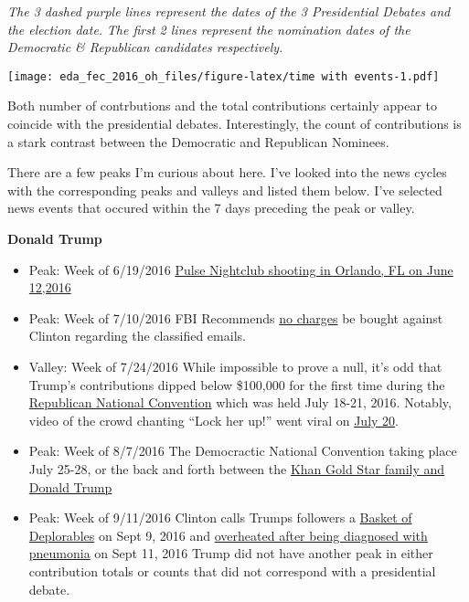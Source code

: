 \documentclass[]{article}
\providecommand{\tightlist}{%
  \setlength{\itemsep}{0pt}\setlength{\parskip}{0pt}}
\begin{document}
\emph{The 3 dashed purple lines represent the dates of the 3
Presidential Debates and the election date.} \emph{The first 2 lines
represent the nomination dates of the Democratic \& Republican
candidates respectively.}

\texttt{[image: eda\_fec\_2016\_oh\_files/figure-latex/time with events-1.pdf]}

Both number of contrbutions and the total contributions certainly appear
to coincide with the presidential debates. Interestingly, the count of
contributions is a stark contrast between the Democratic and Republican
Nominees.

There are a few peaks I'm curious about here. I've looked into the news
cycles with the corresponding peaks and valleys and listed them below.
I've selected news events that occured within the 7 days preceding the
peak or valley.

\textbf{Donald Trump}

\begin{itemize}
\tightlist
\item
  Peak: Week of 6/19/2016 \textbar{}
  \href{https://www.cnn.com/2016/06/12/us/orlando-nightclub-shooting/index.html}{Pulse
  Nightclub shooting in Orlando, FL on June 12,2016}
\item
  Peak: Week of 7/10/2016 \textbar{} FBI Recommends
  \href{https://www.nytimes.com/2016/07/06/us/politics/hillary-clinton-fbi-email-comey.html}{no
  charges} be bought against Clinton regarding the classified emails.
\item
  Valley: Week of 7/24/2016 \textbar{} While impossible to prove a null,
  it's odd that Trump's contributions dipped below \$100,000 for the
  first time during the \href{https://www.2016cle.com/}{Republican
  National Convention} which was held July 18-21, 2016. Notably, video
  of the crowd chanting ``Lock her up!'' went viral on
  \href{https://www.washingtonpost.com/news/the-fix/wp/2016/11/22/a-brief-history-of-the-lock-her-up-chant-as-it-looks-like-trump-might-not-even-try/}{July
  20}.
\item
  Peak: Week of 8/7/2016 \textbar{} The Democractic National Convention
  taking place July 25-28, or the back and forth between the
  \href{https://thehill.com/policy/national-security/290049-trump-khan-feud-a-timeline}{Khan
  Gold Star family and Donald Trump}
\item
  Peak: Week of 9/11/2016 \textbar{} Clinton calls Trumps followers a
  \href{https://www.youtube.com/watch?v=OZHp4JLWjNw}{Basket of
  Deplorables} on Sept 9, 2016 and
  \href{https://www.usatoday.com/story/news/politics/elections/2016/2016/09/11/clinton-overheating-spell-may-intensify-focus-health/90231436/}{overheated
  after being diagnosed with pneumonia} on Sept 11, 2016 Trump did not
  have another peak in either contribution totals or counts that did not
  correspond with a presidential debate.
\end{itemize}
\end{document}
